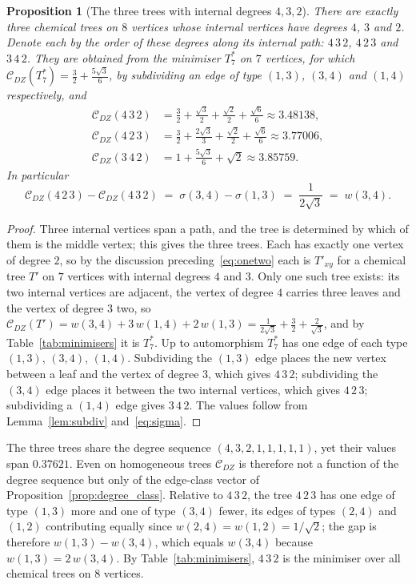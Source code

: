\documentclass[11pt,a4paper]{article}
\theoremstyle{plain}
\newtheorem{proposition}[theorem]{Proposition}
\theoremstyle{definition}
\theoremstyle{remark}
\newcommand{\CDZ}{\mathcal{C}_{DZ}}
\begin{document}
\begin{proposition}[The three trees with internal degrees $4,3,2$]
\label{prop:432}
There are exactly three chemical trees on $8$ vertices whose internal vertices
have degrees $4$, $3$ and $2$. Denote each by the order of these degrees along
its internal path: $4\,3\,2$, $4\,2\,3$ and $3\,4\,2$. They are obtained from
the minimiser $T^*_7$ on $7$ vertices, for which $\CDZ(T^*_7)=\tfrac32+\tfrac{5\sqrt3}{6}$,
by subdividing an edge of type $(1,3)$, $(3,4)$ and $(1,4)$ respectively, and
\begin{align*}
  \CDZ(4\,3\,2)&=\tfrac32+\tfrac{\sqrt3}{2}+\tfrac{\sqrt2}{2}+\tfrac{\sqrt6}{6}\approx3.48138,\\
  \CDZ(4\,2\,3)&=\tfrac32+\tfrac{2\sqrt3}{3}+\tfrac{\sqrt2}{2}+\tfrac{\sqrt6}{6}\approx3.77006,\\
  \CDZ(3\,4\,2)&=1+\tfrac{5\sqrt3}{6}+\sqrt2\approx3.85759 .
\end{align*}
In particular
\[
  \CDZ(4\,2\,3)-\CDZ(4\,3\,2)\;=\;\sigma(3,4)-\sigma(1,3)\;=\;\frac{1}{2\sqrt3}\;=\;w(3,4).
\]
\end{proposition}

\begin{proof}
Three internal vertices span a path, and the tree is determined by which of them
is the middle vertex; this gives the three trees. Each has exactly one vertex of
degree $2$, so by the discussion preceding~\eqref{eq:onetwo} each is $T'_{xy}$
for a chemical tree $T'$ on $7$ vertices with internal degrees $4$ and $3$. Only
one such tree exists: its two internal vertices are adjacent, the vertex of
degree $4$ carries three leaves and the vertex of degree $3$ two, so
$\CDZ(T')=w(3,4)+3\,w(1,4)+2\,w(1,3)=\tfrac{1}{2\sqrt3}+\tfrac32+\tfrac{2}{\sqrt3}$,
and by Table~\ref{tab:minimisers} it is $T^*_7$. Up to automorphism $T^*_7$ has
one edge of each type $(1,3)$, $(3,4)$, $(1,4)$. Subdividing the $(1,3)$ edge
places the new vertex between a leaf and the vertex of degree $3$, which gives
$4\,3\,2$; subdividing the $(3,4)$ edge places it between the two internal
vertices, which gives $4\,2\,3$; subdividing a $(1,4)$ edge gives $3\,4\,2$. The
values follow from Lemma~\ref{lem:subdiv} and~\eqref{eq:sigma}.
\end{proof}

The three trees share the degree sequence $(4,3,2,1,1,1,1,1)$, yet their values
span $0.37621$. Even on homogeneous trees $\CDZ$ is therefore not a function of
the degree sequence but only of the edge-class vector of
Proposition~\ref{prop:degree_class}. Relative to $4\,3\,2$, the tree $4\,2\,3$
has one edge of type $(1,3)$ more and one of type $(3,4)$ fewer, its edges of
types $(2,4)$ and $(1,2)$ contributing equally since $w(2,4)=w(1,2)=1/\sqrt2$;
the gap is therefore $w(1,3)-w(3,4)$, which equals $w(3,4)$ because
$w(1,3)=2\,w(3,4)$. By Table~\ref{tab:minimisers}, $4\,3\,2$ is the minimiser
over all chemical trees on $8$ vertices.
\end{document}
